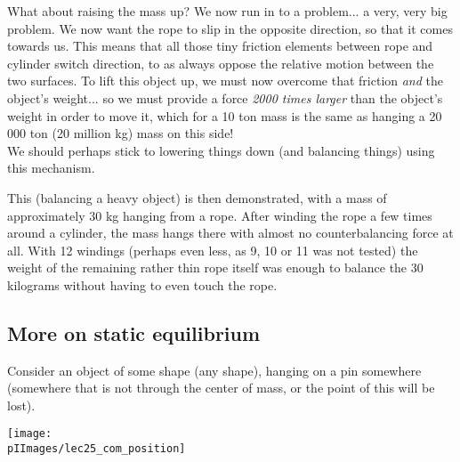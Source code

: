 What about raising the mass up? We now run in to a problem... a very, very big problem. We now want the rope to slip in the opposite direction, so that it comes towards us. This means that all those tiny friction elements between rope and cylinder switch direction, to as always oppose the relative motion between the two surfaces. To lift this object up, we must now overcome that friction \emph{and} the object's weight... so we must provide a force \emph{2000 times larger} than the object's weight in order to move it, which for a 10 ton mass is the same as hanging a 20 000 ton (20 million kg) mass on this side!\\
We should perhaps stick to lowering things down (and balancing things) using this mechanism.

This (balancing a heavy object) is then demonstrated, with a mass of approximately 30 kg hanging from a rope. After winding the rope a few times around a cylinder, the mass hangs there with almost no counterbalancing force at all. With 12 windings (perhaps even less, as 9, 10 or 11 was not tested) the weight of the remaining rather thin rope itself was enough to balance the 30 kilograms without having to even touch the rope.

\subsection{More on static equilibrium}

Consider an object of some shape (any shape), hanging on a pin somewhere (somewhere that is not through the center of mass, or the point of this will be lost).

\begin{center}
\texttt{[image: \\pIImages/lec25\_com\_position]}
\end{center}

\begin{figure}[H]
  \centering
{}
\end{figure}


